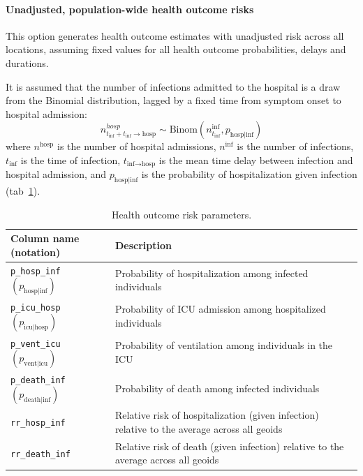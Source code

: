 {\paragraph{Unadjusted, population-wide health outcome risks}
This option generates health outcome estimates with unadjusted risk across all locations, assuming fixed values for all health outcome probabilities, delays and durations.

It is assumed that the number of infections admitted to the hospital is a draw from the Binomial distribution, lagged by a fixed time from symptom onset to hospital admission:
\begin{equation}
n_{t_\text{inf} + t_\text{inf} \to \text{hosp}}^{hosp} \sim \text{Binom}\left(n_{t_\text{inf}}^\text{inf}, p_{\text{hosp}\mid \text{inf}} \right)
\end{equation}
where $n^\text{hosp}$ is the number of hospital admissions, $n^\text{inf}$ is the number of infections, $t_\text{inf}$ is the time of infection, $t_{\text{inf} \to \text{hosp}}$ is the mean time delay between infection and hospital admission, and $p_{\text{hosp} \mid \text{inf}}$ is the probability of hospitalization given infection (tab~\ref{tab:csp-outcomes}).

\begin{table}[t]
\label{tab:csp-outcomes}
\centering
\begin{tabular}{ll}
\toprule
 Column name (notation) & Description\\
\midrule
\verb|p_hosp_inf| $(p_{\text{hosp} \mid \text{inf}})$	& Probability of hospitalization among infected individuals\\
\verb|p_icu_hosp| $(p_{\text{icu} \mid \text{hosp}})$	&Probability of ICU admission among hospitalized individuals\\
\verb|p_vent_icu| $(p_{\text{vent} \mid \text{icu}})$ &	Probability of ventilation among individuals in the ICU\\
\verb|p_death_inf| $(p_{\text{death} \mid \text{inf}})$ &	Probability of death among infected individuals\\
\verb|rr_hosp_inf|	& Relative risk of hospitalization (given infection) relative to the average across all geoids\\
\verb|rr_death_inf| & Relative risk of death (given infection) relative to the average across all geoids\\
\bottomrule
\end{tabular}
\caption[Health outcome risk parameters.]{Health outcome risk parameters.}
\end{table}

}
